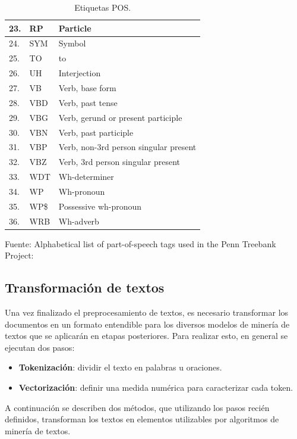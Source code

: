 \begin{table}[h!]
\begin{tabular}{|l|l|l|}
23.    & RP    & Particle                                 \\ \hline
24.    & SYM   & Symbol                                   \\ \hline
25.    & TO    & to                                       \\ \hline
26.    & UH    & Interjection                             \\ \hline
27.    & VB    & Verb, base form                          \\ \hline
28.    & VBD   & Verb, past tense                         \\ \hline
29.    & VBG   & Verb, gerund or present participle       \\ \hline
30.    & VBN   & Verb, past participle                    \\ \hline
31.    & VBP   & Verb, non-3rd person singular present    \\ \hline
32.    & VBZ   & Verb, 3rd person singular present        \\ \hline
33.    & WDT   & Wh-determiner                            \\ \hline
34.    & WP    & Wh-pronoun                               \\ \hline
35.    & WP\$  & Possessive wh-pronoun                    \\ \hline
36.    & WRB   & Wh-adverb                                \\ \hline
\end{tabular}
\caption{\label{table:Etiquetas_POS} Etiquetas POS.} Fuente: Alphabetical list of part-of-speech tags used in the Penn Treebank Project:
\cite{POS_Tag}
\end{table}

\subsection{Transformación de textos}
    Una vez finalizado el preprocesamiento de textos, es necesario transformar los documentos en un formato entendible para los diversos modelos de minería de textos que se aplicarán en etapas posteriores. Para realizar esto, en general se ejecutan dos pasos:
    \begin{itemize}
        \item \textbf{Tokenización}: dividir el texto en palabras u oraciones. 
        \item \textbf{Vectorización}: definir una medida numérica para caracterizar cada token.
    \end{itemize}
    A continuación se describen dos métodos, que utilizando los pasos recién definidos, transforman los textos en elementos utilizables por algoritmos de minería de textos.
